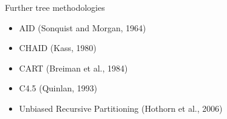 \documentclass[11pt,compress,t,notes=noshow, xcolor=table]{beamer}
\begin{document}
\begin{vbframe}{Further tree methodologies}

\begin{itemize}
\item AID (Sonquist and Morgan, 1964)
\item CHAID (Kass, 1980)
\item CART (Breiman et al., 1984)
\item C4.5 (Quinlan, 1993)
\item Unbiased Recursive Partitioning (Hothorn et al., 2006)
\end{itemize}

\end{vbframe}

\endlecture
\end{document}
